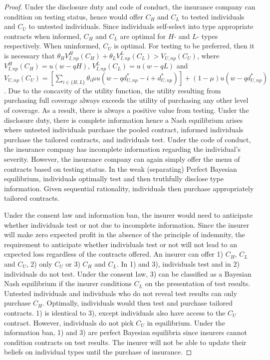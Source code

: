 \documentclass[nonatbib,preprint,12pt]{elsarticle}
\theoremstyle{plain}
\theoremstyle{definition}
\theoremstyle{plain}
\theoremstyle{TheoremNum}
\theoremstyle{CorollaryNum}
\theoremstyle{PropositionNum}
\theoremstyle{TheoremNum}
\begin{document}
\begin{proof}
Under the disclosure duty and code of conduct, the insurance company can condition on testing status, hence would offer $C_H$ and $C_L$ to tested individuals and $C_U$ to untested individuals. Since individuals self-select into type appropriate contracts when informed, $C_H$ and $C_L$ are optimal for $H$- and $L$- types respectively. When uninformed, $C_U$ is optimal. For testing to be preferred, then it is necessary that $\theta_H V_{I,np}^H(C_H)+\theta_L V_{I,np}^L(C_L) > V_{U,np} (C_U)$, where $V_{I,np}^H(C_H) = u(w-qH)$, $V_{I,np}^L(C_L) = u(w-qL)$ and $V_{U,np} (C_U) = [\sum_{i \in \{H,L\}} \theta_i \mu u(w-qd_{U,np}^* -i+d_{U,np}^*)]+ (1-\mu)u(w-qd_{U,np}^*)$. Due to the concavity of the utility function, the utility resulting from purchasing full coverage always exceeds the utility of purchasing any other level of coverage. As a result, there is always a positive value from testing. Under the disclosure duty, there is complete information hence a Nash equilibrium arises where untested individuals purchase the pooled contract, informed individuals purchase the tailored contracts, and individuals test. Under the code of conduct, the insurance company has incomplete information regarding the individual's severity. However, the insurance company can again simply offer the menu of contracts based on testing status. In the weak (separating) Perfect Bayesian equilibrium, individuals optimally test and then truthfully disclose type information. Given sequential rationality, individuals then purchase appropriately tailored contracts.

Under the consent law and information ban, the insurer would need to anticipate whether individuals test or not due to incomplete information. Since the insurer will make zero expected profit in the absence of the principle of indemnity, the requirement to anticipate whether individuals test or not will not lead to an expected loss regardless of the contracts offered. An insurer can offer 1) $C_H$, $C_L$ and $C_U$, 2) only $C_U$ or 3) $C_H$ and $C_L$. In 1) and 3), individuals test and in 2) individuals do not test. Under the consent law, 3) can be classified as a Bayesian Nash equilibrium if the insurer conditions $C_L$ on the presentation of test results. Untested individuals and individuals who do not reveal test results can only purchase $C_H$. Optimally, individuals would then test and purchase tailored contracts. 1) is identical to 3), except individuals also have access to the $C_U$ contract. However, individuals do not pick $C_U$ in equilibrium. Under the information ban, 1) and 3) are perfect Bayesian equilibria since insurers cannot condition contracts on test results. The insurer will not be able to update their beliefs on individual types until the purchase of insurance.


\end{proof}
\end{document}
